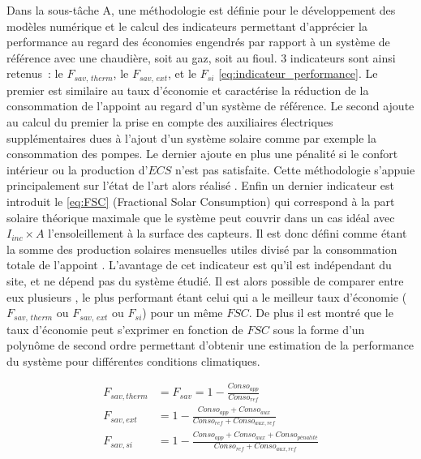 Dans la sous-tâche A, une méthodologie est définie pour le développement des modèles
numérique et le calcul des indicateurs permettant d’apprécier la performance au regard des
économies engendrés par rapport à un système de référence avec une chaudière, soit au gaz,
soit au fioul. $3$ indicateurs sont ainsi retenus~: le $F_{sav,\,therm}$, le $F_{sav,\,ext}$,
et le $F_{si}$ \eqref{eq:indicateur_performance}. Le premier est similaire
au taux d’économie et caractérise la réduction de la
consommation de l’appoint au regard d’un système de référence. Le second ajoute au calcul
du premier la prise en compte des auxiliaires électriques supplémentaires dues à l’ajout
d’un système solaire comme par exemple la consommation des pompes. Le dernier ajoute en
plus une pénalité si le confort intérieur ou la production d’$ECS$ n’est pas satisfaite.
Cette méthodologie s’appuie principalement sur l’état de l’art alors réalisé \parencite{Task26A2002}.
Enfin un dernier indicateur est introduit le  \eqref{eq:FSC} (Fractional Solar Consumption)
qui correspond à la part solaire théorique maximale que le système peut couvrir dans un cas idéal avec $I_{inc} \times A$
l’ensoleillement à la surface des capteurs. Il est donc défini comme étant la somme des production solaires mensuelles
utiles divisé par la consommation totale de l’appoint \parencite{Letz2009}. L’avantage de cet indicateur
est qu’il est indépendant du site, et ne dépend pas du système étudié. Il est alors possible
de comparer entre eux plusieurs , le plus performant étant celui qui a le meilleur taux d’économie
($F_{sav,\,therm}$ ou $F_{sav,\,ext}$ ou $F_{si}$) pour un même $FSC$. De plus il est montré
que le taux d’économie peut s’exprimer en fonction de $FSC$ sous la forme d’un polynôme de second ordre
permettant d’obtenir une estimation de la performance du système pour différentes conditions climatiques.

\begin{subequations}\label{eq:indicateur_performance}
    \begin{align}
        F_{sav, therm} &=  F_{sav} = 1 - \frac{Conso_{app}}{Conso_{ref}}                        \\[10pt]
        F_{sav, ext}   &= 1 - \frac{Conso_{app} + Conso_{aux}}{Conso_{ref} + Conso_{aux, ref}}  \\[10pt]
        F_{sav, si}    &= 1 - \frac{Conso_{app} + Conso_{aux} + Conso_{pénalité}}{Conso_{ref} + Conso_{aux, ref}}  \\[10pt]
    \end{align}
\end{subequations}


